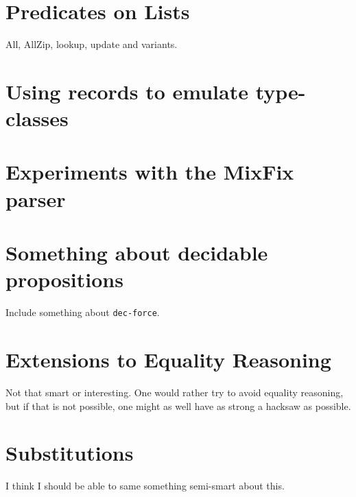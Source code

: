 
\section{Predicates on Lists}
All, AllZip, lookup, update and variants.

\section{Using records to emulate type-classes}

\section{Experiments with the MixFix parser}

\section{Something about decidable propositions}
Include something about \texttt{dec-force}.

\section{Extensions to Equality Reasoning}
Not that smart or interesting. One would rather try to avoid equality reasoning,
but if that is not possible, one might as well have as strong a hacksaw as
possible.


\section{Substitutions}
I think I should be able to same something semi-smart about this.

